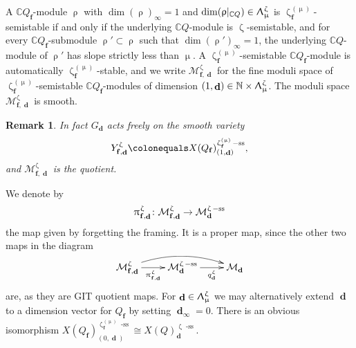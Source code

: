 \documentclass[a4paper,10pt]{amsart}
\renewcommand{\zeta}{\upzeta}
\renewcommand{\pi}{\uppi\hspace{0.05em}}
\renewcommand{\rho}{\uprho}
\renewcommand{\Lambda}{\Uplambda}
\renewcommand{\mu}{\upmu}
\newtheorem{remark}[theorem]{Remark}
\newcommand{\ff}{\mathbf{f}}
\newcommand{\Msp}{\mathcal{M}}
\DeclareMathOperator{\sst}{-ss}
\DeclareMathOperator{\dd}{\mathbf{d}}
\begin{document}
 A $\mathbb{C} Q_{\ff}$-module $\rho$ with $\dim(\rho)_{\infty}=1$ and $\dim(\rho|_{\mathbb{C}Q})\in \Lambda^{\zeta}_{\mu}$ is $\zeta^{(\mu)}_{\ff}$-semistable if and only if the underlying $\mathbb{C} Q$-module is $\zeta$-semistable, and for every $\mathbb{C}Q_{\ff}$-submodule $\rho'\subset \rho$ such that $\dim(\rho')_{\infty}=1$, the underlying $\mathbb{C} Q$-module of $\rho'$ has slope strictly less than $\mu$.  A $\zeta^{(\mu)}_{\ff}$-semistable $\mathbb{C}Q_{\ff}$-module is automatically $\zeta^{(\mu)}_{\ff}$-stable, and we write $\Msp^{\zeta}_{\ff,\dd}$ for the fine moduli space of $\zeta^{(\mu)}_{\ff}$-semistable $\mathbb{C} Q_{\ff}$-modules of dimension $(1,\dd)\in\mathbb{N}\times\Lambda_{\mu}^{\zeta}$.  The moduli space $\Msp_{\ff,\dd}^{\zeta}$ is smooth. 

\begin{remark}
In fact $G_{\dd}$ acts freely on the smooth variety 
\begin{equation}
\label{Ydef}
Y_{\ff,\dd}^{\zeta}\colonequals X(Q_{\ff})^{\zeta_{\ff}^{(\mu)}\sst}_{(1,\dd)},
\end{equation}
and $\Msp_{\ff,\dd}^{\zeta}$ is the quotient.
\end{remark}

We denote by 
\[
\pi_{\ff,\dd}^{\zeta}\colon\Msp^{\zeta}_{\ff,\dd}\rightarrow \Msp^{\zeta\sst}_{\dd}
\]
the map given by forgetting the framing.  It is a proper map, since the other two maps in the diagram
\[
\xymatrix{
\Msp^{\zeta}_{\ff,\dd}\ar@/^1pc/[rr]\ar[r]_-{\pi^\zeta_{\ff,\dd}}&\Msp_{\dd}^{\zeta\sst}\ar[r]_-{q^\zeta_{\dd}}&\Msp_{\dd}
}
\]
are, as they are GIT quotient maps.
\smallbreak
For $\dd\in\Lambda_{\mu}^{\zeta}$ we may alternatively extend $\dd$ to a dimension vector for $Q_{\ff}$ by setting $\dd_{\infty}=0$.  There is an obvious isomorphism $X(Q_{\ff})_{(0,\dd)}^{\zeta_{\ff}^{(\mu)}\sst}\cong X(Q)_{\dd}^{\zeta\sst}$.
\smallbreak
\end{document}
